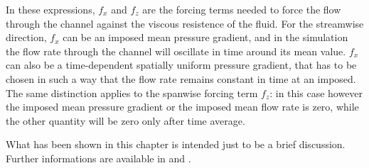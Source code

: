  In these expressions, $f_{x}$ and $f_{z}$ are the forcing terms needed to force the flow through the channel against the viscous resistence of the fluid. For the streamwise direction, $f_{x}$ can be an imposed mean pressure gradient, and in the simulation the flow rate through the channel will oscillate in time around its mean value. $f_{x}$ can also be a time-dependent spatially uniform pressure gradient, that has to be chosen in such a way that the flow rate remains constant in time at an imposed. The same distinction applies to the spanwise forcing term $f_{z}$: in this case however the imposed mean pressure gradient or the imposed mean flow rate is zero, while the other quantity will be zero only after time average.\\
\par
\par
What has been shown in this chapter is intended just to be a brief discussion. Further informations are available in \cite[1-7]{ns:quadrio} and \cite{cpl:presentazione}.

